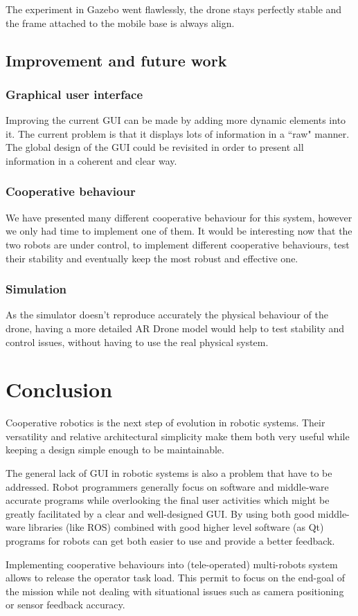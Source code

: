 \documentclass[11pt,a4paper,twocolumn]{article}
\begin{document}
The experiment in Gazebo went flawlessly, the drone stays perfectly stable and the frame attached to the 
mobile base is always align.

\subsection{Improvement and future work}
\subsubsection{Graphical user interface}
Improving the current GUI can be made by adding more dynamic elements into it. The current 
problem is
that it displays lots of information in a ``raw" manner. The global design of the GUI could be 
revisited in
order to present all information  in a coherent and clear way.

\subsubsection{Cooperative behaviour}
We have presented many different cooperative behaviour for this system, however we only had 
time to implement one of them. It would be interesting now that the two robots are under 
control, to implement
different cooperative behaviours, test their stability and eventually keep the most robust and 
effective
one.

\subsubsection{Simulation}
As the simulator doesn't reproduce accurately the physical behaviour of the drone, having a 
more detailed AR Drone model would help to test stability and control issues, without having 
to use the real physical system.

\clearpage
\section{Conclusion}
Cooperative robotics is the next step of evolution in robotic systems.
Their versatility and relative architectural simplicity make them both very useful while
keeping a design simple enough to be maintainable.

The general lack of GUI in robotic systems is also a problem that have to be addressed. 
Robot programmers generally focus on software and middle-ware accurate programs while 
overlooking the final user activities which might be greatly facilitated by a clear and 
well-designed GUI.
By using both good middle-ware libraries (like ROS) combined with good higher level
software (as Qt) programs for robots can get both easier to use and provide a better 
feedback.

Implementing cooperative behaviours into (tele-operated) multi-robots system allows to release 
the operator task load. This permit to focus on the end-goal of the mission while not dealing 
with situational issues such as camera positioning or sensor feedback accuracy.



\listoffigures
\end{document}
